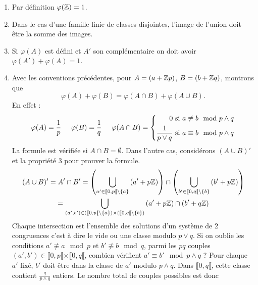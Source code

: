 \begin{enumerate}
  \item Par définition $\varphi(\mathbb{Z}) = 1$.
  \item Dans le cas d'une famille finie de classes disjointes, l'image de l'union doit être la somme des images. 
  \item Si $\varphi(A)$ est défini et $A'$ son complémentaire on doit avoir $\varphi(A') + \varphi(A) = 1$. 
  \item Avec les conventions précédentes, pour $A = \left(a + \mathbb{Z} p\right)$, $B = \left(b + \mathbb{Z} q\right)$, montrons que 
  \begin{displaymath}
    \varphi(A) + \varphi(B) = \varphi(A\cap B) + \varphi(A \cup B).
  \end{displaymath}
  En effet :
  \begin{displaymath}
    \varphi(A) = \frac{1}{p} \hspace{0.5cm}
    \varphi(B) = \frac{1}{q} \hspace{0.5cm}
    \varphi(A \cap B) =
    \left\lbrace
      \begin{aligned}
        0 &\text{ si } a \not \equiv b \mod p\wedge q\\
        \frac{1}{p\vee q} &\text{ si } a \equiv b \mod p\wedge q
      \end{aligned}
    \right.
  \end{displaymath}
  La formule est vérifiée si $A\cap B = \emptyset$. Dans l'autre cas, considérons $(A\cup B)'$ et la propriété 3 pour prouver la formule.
\begin{multline*}
  (A \cup B)' = A' \cap B' 
  =     \left( \bigcup_{a'\in \llbracket 0, p\llbracket \setminus\{a\} } \left(a' + p\mathbb{Z}\right)\right) 
   \cap \left( \bigcup_{b'\in \llbracket 0, q\llbracket \setminus\{b\} } \left(b' + p\mathbb{Z}\right)\right) \\
  = \bigcup_{(a',b')\in (\llbracket 0, p\llbracket \setminus\{a\}) \times (\llbracket 0, q\llbracket \setminus\{b\})} \left(a' + p\mathbb{Z}\right)\cap \left(b' + q\mathbb{Z}\right) 
\end{multline*}
Chaque intersection est l'ensemble des solutions d'un système de 2 congruences c'est à dire le vide ou une classe modulo $p\vee q$.\newline
Si on oublie les conditions $a'\not \equiv a \mod p$ et $b'\not \equiv b \mod q$, parmi les $pq$ couples $(a',b')\in \llbracket 0,p\llbracket \times \llbracket 0,q\llbracket$, combien vérifient $a' \equiv b' \mod p \wedge q$ ? \newline
Pour chaque $a'$ fixé, $b'$ doit être dans la classe de $a'$ modulo $p\wedge q$. Dans $\llbracket 0, q \llbracket$, cette classe contient $\frac{q}{p \wedge q}$ entiers. Le nombre total de couples possibles est donc

\end{enumerate}
